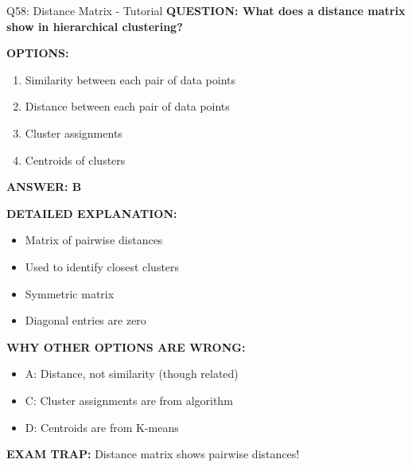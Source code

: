 \documentclass[8pt]{beamer}
\begin{document}
	\begin{frame}{Q58: Distance Matrix - Tutorial}
		\fontsize{6.5}{7.5}\selectfont
		\textbf{QUESTION: What does a distance matrix show in hierarchical clustering?}
		
		\vspace{0.1cm}
		\textbf{OPTIONS:}
		\begin{enumerate}
			\item Similarity between each pair of data points
			\item Distance between each pair of data points
			\item Cluster assignments
			\item Centroids of clusters
		\end{enumerate}
		
		\vspace{0.1cm}
		\textcolor{myblue}{\textbf{ANSWER: B}}
		
		\vspace{0.1cm}
		\textbf{DETAILED EXPLANATION:}
		\begin{itemize}
			\item Matrix of pairwise distances
			\item Used to identify closest clusters
			\item Symmetric matrix
			\item Diagonal entries are zero
		\end{itemize}
		
		\vspace{0.1cm}
		\textcolor{myred}{\textbf{WHY OTHER OPTIONS ARE WRONG:}}
		\begin{itemize}
			\item \textcolor{myred}{A:} Distance, not similarity (though related)
			\item \textcolor{myred}{C:} Cluster assignments are from algorithm
			\item \textcolor{myred}{D:} Centroids are from K-means
		\end{itemize}
		
		\textcolor{myred}{\textbf{EXAM TRAP:}} Distance matrix shows \textcolor{myblue}{pairwise distances}!
	\end{frame}
	
\end{document}
